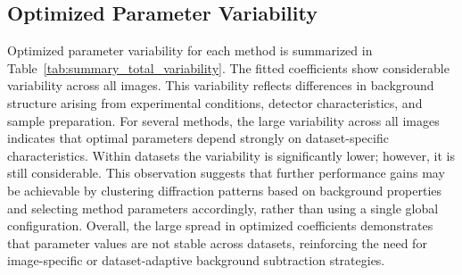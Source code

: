 \documentclass[iucr]{iucrjournals}
\begin{document}
    


\subsection{Optimized Parameter Variability}

Optimized parameter variability for each method is summarized in Table~\ref{tab:summary_total_variability}. The fitted coefficients show considerable variability across all images. This variability reflects differences in background structure arising from experimental conditions, detector characteristics, and sample preparation. For several methods, the large variability across all images indicates that optimal parameters depend strongly on dataset-specific characteristics. Within datasets the variability is significantly lower; however, it is still considerable. This observation suggests that further performance gains may be achievable by clustering diffraction patterns based on background properties and selecting method parameters accordingly, rather than using a single global configuration. Overall, the large spread in optimized coefficients demonstrates that parameter values are not stable across datasets, reinforcing the need for image-specific or dataset-adaptive background subtraction strategies.

\end{document}
